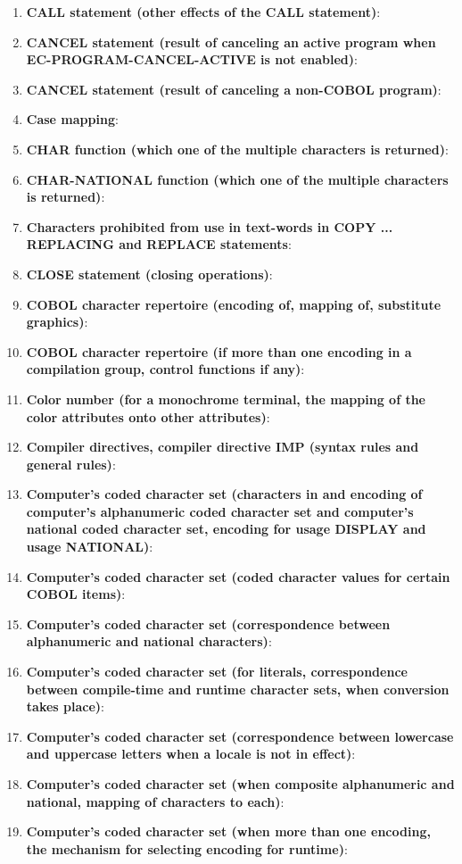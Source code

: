 \begin{enumerate}
\item \textbf{CALL statement (other effects of the CALL statement)}:
\item \textbf{CANCEL statement (result of canceling an active program when EC-PROGRAM-CANCEL-ACTIVE is not enabled)}:
\item \textbf{CANCEL statement (result of canceling a non-COBOL program)}:
\item \textbf{Case mapping}:
\item \textbf{CHAR function (which one of the multiple characters is returned)}:
\item \textbf{CHAR-NATIONAL function (which one of the multiple characters is returned)}:
\item \textbf{Characters prohibited from use in text-words in COPY ... REPLACING and REPLACE statements}:
\item \textbf{CLOSE statement (closing operations)}:
\item \textbf{COBOL character repertoire (encoding of, mapping of, substitute graphics)}:
\item \textbf{COBOL character repertoire (if more than one encoding in a compilation group, control functions if any)}:
\item \textbf{Color number (for a monochrome terminal, the mapping of the color attributes onto other attributes)}:
\item \textbf{Compiler directives, compiler directive IMP (syntax rules and general rules)}:
\item \textbf{Computer's coded character set (characters in and encoding of computer's alphanumeric coded character set and computer's national coded character set, encoding for usage DISPLAY and usage NATIONAL)}:
\item \textbf{Computer's coded character set (coded character values for certain COBOL items)}:
\item \textbf{Computer's coded character set (correspondence between alphanumeric and national characters)}:
\item \textbf{Computer's coded character set (for literals, correspondence between compile-time and runtime character sets, when conversion takes place)}:
\item \textbf{Computer's coded character set (correspondence between lowercase and uppercase letters when a locale is not in effect)}:
\item \textbf{Computer's coded character set (when composite alphanumeric and national, mapping of characters to each)}:
\item \textbf{Computer's coded character set (when more than one encoding, the mechanism for selecting encoding for runtime)}:

\end{enumerate}
